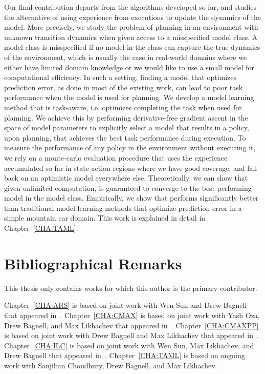 Our final contribution departs from the algorithms developed so far, and studies
the alternative of using experience from executions to update the dynamics of
the model. More precisely, we study the problem of planning in an environment
with unknown transition dynamics when given access to a misspecified model
class. A model class is misspecified if no model in the class can capture the
true dynamics of the environment, which is usually the case in real-world
domains where we either have limited domain knowledge or we would like to use a
small model for computational efficiency. In such a setting, finding a model
that optimizes prediction error, as done in most of the existing work, can
lead to poor task performance when the model is used for planning. We develop a
model learning method \taml{} that is task-aware, i.e. optimizes completing the task
when used for planning. We achieve this by performing derivative-free gradient
ascent in the space of model parameters to explicitly select a model that
results in a policy, upon planning, that achieves the best task performance
during execution. To measure the performance of any policy in the
environment without executing it, we rely on a monte-carlo evaluation procedure
that uses the experience accumulated so far in
state-action regions where we have good coverage, and fall back on an
optimistic model everywhere else. Theoretically, we can show that given
unlimited computation, \taml{} is guaranteed to converge to the best performing
model in the model class. Empirically, we show that \taml{} performs
significantly better than traditional model learning methods that optimize
prediction error in a simple mountain car domain. This work is explained in
detail in Chapter~\ref{CHA:TAML}.

\section{Bibliographical Remarks}
\label{sec:bibl-remarks}

This thesis only contains works for which this author is the primary
contributor.

Chapter~\ref{CHA:ARS} is based on joint work with Wen Sun and Drew Bagnell
that appeared in~\cite{aistats19}.
Chapter~\ref{CHA:CMAX} is based on joint work with Yash Oza, Drew Bagnell, and Max
Likhachev that appeared in~\cite{cmax}.
Chapter~\ref{CHA:CMAXPP} is based on joint work with Drew Bagnell and Max
Likhachev that appeared in~\cite{cmaxpp}.
Chapter~\ref{CHA:ILC} is based on joint work with Wen Sun, Max Likhachev,
and Drew Bagnell that appeared in~\cite{ilc}.
Chapter~\ref{CHA:TAML} is based on ongoing work with Sanjiban Choudhury, Drew
Bagnell, and Max Likhachev.

